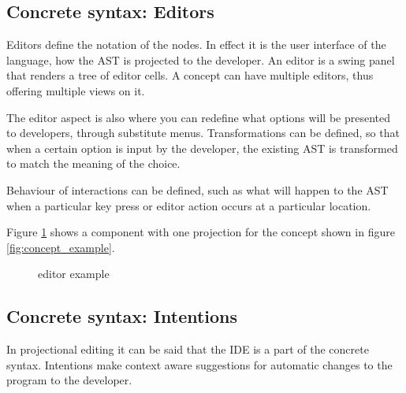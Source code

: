 \subsection{Concrete syntax: Editors}
Editors define the notation of the nodes.
In effect it is the user interface of the language, how the AST is projected to the developer.
An editor is a swing panel that renders a tree of editor cells.
A concept can have multiple editors, thus offering multiple views on it.

The editor aspect is also where you can redefine what options will be presented to developers, through substitute menus.
Transformations can be defined, so that when a certain option is input by the developer, the existing AST is transformed to match the meaning of the choice.

Behaviour of interactions can be defined, such as what will happen to the AST when a particular key press or editor action occurs at a particular location.

Figure \ref{fig:editor_example} shows a component with one projection for the concept shown in figure \ref{fig:concept_example}.
\begin{figure}[h]
    \centering
    \caption{editor example}
    \label{fig:editor_example}
\end{figure}
 

\subsection{Concrete syntax: Intentions}
In projectional editing it can be said that the IDE is a part of the concrete syntax.
Intentions make context aware suggestions for automatic changes to the program to the developer.

